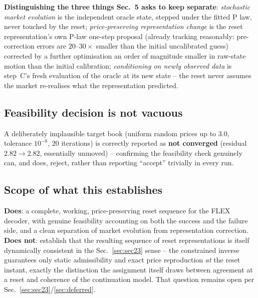 \textbf{Distinguishing the three things Sec.~5 asks to keep separate}:
\emph{stochastic market evolution} is the independent oracle state, stepped
under the fitted P law, never touched by the reset; \emph{price-preserving
representation change} is the reset representation's own P-law one-step
proposal (already tracking reasonably: pre-correction errors are
$20$--$30\times$ smaller than the initial uncalibrated guess) corrected by a
further optimisation an order of magnitude smaller in raw-state motion than
the initial calibration; \emph{conditioning on newly observed data} is
step~C's fresh evaluation of the oracle at its new state -- the reset never
assumes the market re-realises what the representation predicted.

\subsection{Feasibility decision is not vacuous}

A deliberately implausible target book (uniform random prices up to $3.0$,
tolerance $10^{-8}$, $20$ iterations) is correctly reported as
\textbf{not converged} (residual $2.82\to2.82$, essentially unmoved) --
confirming the feasibility check genuinely can, and does, reject, rather than
reporting ``accept'' trivially in every run.

\subsection{Scope of what this establishes}

\textbf{Does}: a complete, working, price-preserving reset sequence for the
FLEX decoder, with genuine feasibility accounting on both the success and the
failure side, and a clean separation of market evolution from representation
correction. \textbf{Does not}: establish that the resulting sequence of reset
representations is itself dynamically consistent in the Sec.~\ref{sec:sec23}
sense -- the constrained inverse guarantees only static admissibility and
exact price reproduction \emph{at} the reset instant, exactly the distinction
the assignment itself draws between agreement at a reset and coherence of the
continuation model. That question remains open per
Sec.~\ref{sec:sec23}/\ref{sec:deferred}.
